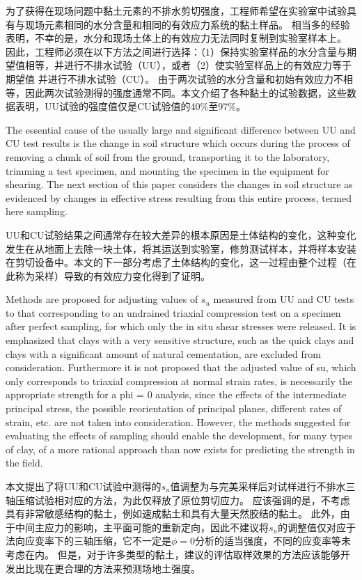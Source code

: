 \begin{paracol}{2}
    \switchcolumn

    为了获得在现场问题中黏土元素的不排水剪切强度，工程师希望在实验室中试验具有与现场元素相同的水分含量和相同的有效应力系统的黏土样品。 相当多的经验表明，不幸的是，水分和现场土体上的有效应力无法同时复制到实验室样本上。 因此，工程师必须在以下方法之间进行选择：（1）保持实验室样品的水分含量与期望值相等，并进行不排水试验（UU），或者（2）使实验室样品上的有效应力等于期望值 并进行不排水试验（CU）。 由于两次试验的水分含量和初始有效应力不相等，因此两次试验测得的强度通常不同。本文介绍了各种黏土的试验数据，这些数据表明，UU试验的强度值仅是CU试验值的40$\%$至97$\%$。

    \switchcolumn*

    The essential cause of the usually large and significant difference between UU and CU test results is the change in soil structure which occurs during the process of removing a chunk of soil from the ground, transporting it to the laboratory, trimming a test specimen, and mounting the specimen in the equipment for shearing. The next section of this paper considers the changes in soil structure as evidenced by changes in effective stress resulting from this entire process, termed here sampling. 

    \switchcolumn

    UU和CU试验结果之间通常存在较大差异的根本原因是土体结构的变化，这种变化发生在从地面上去除一块土体，将其运送到实验室，修剪测试样本，并将样本安装在剪切设备中。本文的下一部分考虑了土体结构的变化，这一过程由整个过程（在此称为采样）导致的有效应力变化得到了证明。

    \switchcolumn*
    
    Methods are proposed for adjusting values of $s_u$ measured from UU and CU tests to that corresponding to an undrained triaxial compression test on a specimen after perfect sampling, for which only the in situ shear stresses were released. It is emphasized that clays with a very sensitive structure, such as the quick clays and clays with a significant amount of natural cementation, are excluded from consideration. Furthermore it is not proposed that the adjusted value of su, which only corresponds to triaxial compression at normal strain rates, is necessarily the appropriate strength for a phi = 0 analysis, since the effects of the intermediate principal stress, the possible reorientation of principal planes, different rates of strain, etc. are not taken into consideration. However, the methods suggested for evaluating the effects of sampling should enable the development, for many types of clay, of a more rational approach than now exists for predicting the strength in the field. 

    \switchcolumn
    
    本文提出了将UU和CU试验中测得的$s_u$值调整为与完美采样后对试样进行不排水三轴压缩试验相对应的方法，为此仅释放了原位剪切应力。 应该强调的是，不考虑具有非常敏感结构的黏土，例如速成黏土和具有大量天然胶结的黏土。 此外，由于中间主应力的影响，主平面可能的重新定向，因此不建议将$s_u$的调整值仅对应于法向应变率下的三轴压缩，它不一定是$\phi=0$分析的适当强度，不同的应变率等未考虑在内。 但是，对于许多类型的黏土，建议的评估取样效果的方法应该能够开发出比现在更合理的方法来预测场地土强度。

\end{paracol}